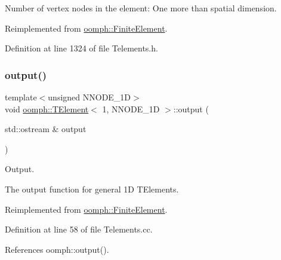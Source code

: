 Number of vertex nodes in the element\+: One more than spatial dimension. 



Reimplemented from \hyperlink{classoomph_1_1FiniteElement_a45631a7aa50efc3123a921d114f84cba}{oomph\+::\+Finite\+Element}.



Definition at line 1324 of file Telements.\+h.

\mbox{\label{classoomph_1_1TElement_3_011_00_01NNODE__1D_01_4_a0e38a73514f3eb757f5041790f6b7ddc}} 
\subsubsection{\texorpdfstring{output()}{output()}\hspace{0.1cm}{\footnotesize\ttfamily [1/4]}}
{\footnotesize\ttfamily template$<$unsigned N\+N\+O\+D\+E\+\_\+1D$>$ \\
void \hyperlink{classoomph_1_1TElement}{oomph\+::\+T\+Element}$<$ 1, N\+N\+O\+D\+E\+\_\+1D $>$\+::output (\begin{DoxyParamCaption}\item[{std\+::ostream \&}]{output }\end{DoxyParamCaption})\hspace{0.3cm}{\ttfamily [virtual]}}



Output. 

The output function for general 1D T\+Elements. 

Reimplemented from \hyperlink{classoomph_1_1FiniteElement_a2ad98a3d2ef4999f1bef62c0ff13f2a7}{oomph\+::\+Finite\+Element}.



Definition at line 58 of file Telements.\+cc.



References oomph\+::output().

\mbox{\label{classoomph_1_1TElement_3_011_00_01NNODE__1D_01_4_a3de69d0bb4459e3f22383ccea5d55e0a}} 
